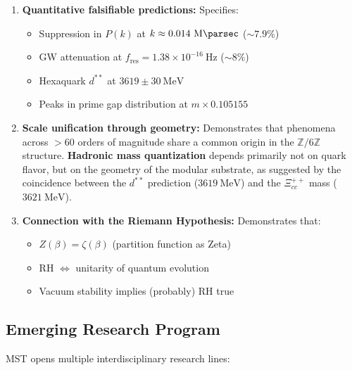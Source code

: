 \documentclass[11pt, a4paper]{article}
\theoremstyle{plain}
\theoremstyle{definition}
\begin{document}
\begin{enumerate}
    \item \textbf{Quantitative falsifiable predictions:} Specifies:
    \begin{itemize}
        \item Suppression in $P(k)$ at $k \approx 0.014\ \si{\per\mega\parsec}$ ($\sim 7.9\%$)
        \item GW attenuation at $f_{\text{res}} = 1.38 \times 10^{-16}\ \si{\hertz}$ ($\sim 8\%$)
        \item Hexaquark $d^{**}$ at $3619 \pm 30\ \si{\mega\electronvolt}$
        \item Peaks in prime gap distribution at $m \times 0.105155$
    \end{itemize}

    \item \textbf{Scale unification through geometry:} Demonstrates that phenomena across $>60$ orders of magnitude share a common origin in the $\mathbb{Z}/6\mathbb{Z}$ structure. \textbf{Hadronic mass quantization} depends primarily not on quark flavor, but on the geometry of the modular substrate, as suggested by the coincidence between the $d^{**}$ prediction ($3619\ \si{\mega\electronvolt}$) and the $\Xi_{cc}^{++}$ mass ($3621\ \si{\mega\electronvolt}$).
    
    \item \textbf{Connection with the Riemann Hypothesis:} Demonstrates that:
    \begin{itemize}
        \item $Z(\beta) = \zeta(\beta)$ (partition function as Zeta)
        \item RH $\Leftrightarrow$ unitarity of quantum evolution
        \item Vacuum stability implies (probably) RH true
    \end{itemize}
\end{enumerate}

\subsection{Emerging Research Program}

MST opens multiple interdisciplinary research lines:
\end{document}
